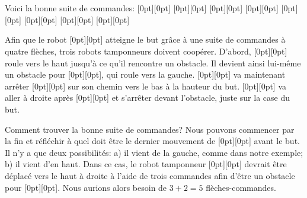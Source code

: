 {{\section*{\BrochureSolution}
Voici la bonne suite de commandes:
\raisebox{-0.5ex}[0pt][0pt]{} \raisebox{-0.5ex}[0pt][0pt]{}  \raisebox{-0.5ex}[0pt][0pt]{} \raisebox{-0.5ex}[0pt][0pt]{}  \raisebox{-0.5ex}[0pt][0pt]{} \raisebox{-0.5ex}[0pt][0pt]{}  \raisebox{-0.5ex}[0pt][0pt]{} \raisebox{-0.5ex}[0pt][0pt]{}

Afin que le robot \raisebox{-0.5ex}[0pt][0pt]{} atteigne le but grâce à une suite de commandes à quatre flèches, trois robots tamponneurs doivent coopérer. D’abord, \raisebox{-0.5ex}[0pt][0pt]{} roule vers le haut jusqu’à ce qu’il rencontre un obstacle. Il devient ainsi lui-même un obstacle pour \raisebox{-0.5ex}[0pt][0pt]{}, qui roule vers la gauche. \raisebox{-0.5ex}[0pt][0pt]{} va maintenant arrêter \raisebox{-0.5ex}[0pt][0pt]{} sur son chemin vers le bas à la hauteur du but. \raisebox{-0.5ex}[0pt][0pt]{} va aller à droite après \raisebox{-0.5ex}[0pt][0pt]{} et s’arrêter devant l’obstacle, juste sur la case du but.

{\centering%
\par}

Comment trouver la bonne suite de commandes? Nous pouvons commencer par la fin et réfléchir à quel doit être le dernier mouvement de \raisebox{-0.5ex}[0pt][0pt]{} avant le but. Il n’y a que deux possibilités: a) il vient de la gauche, comme dans notre exemple; b) il vient d’en haut. Dans ce cas, le robot tamponneur \raisebox{-0.5ex}[0pt][0pt]{} devrait être déplacé vers le haut à droite à l’aide de trois commandes afin d’être un obstacle pour \raisebox{-0.5ex}[0pt][0pt]{}. Nous aurions alors besoin de ${3 + 2 = 5}$ flèches-commandes.

}}
